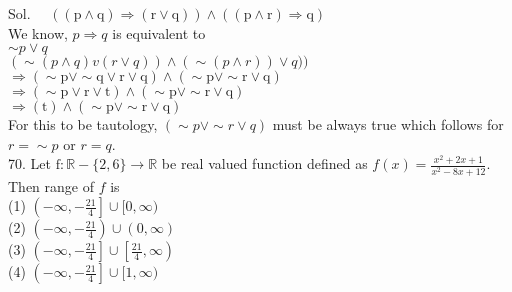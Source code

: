 \documentclass[10pt]{article}
\begin{document}
Sol. \(\quad((\mathrm{p} \wedge \mathrm{q}) \Rightarrow(\mathrm{r} \vee \mathrm{q})) \wedge((\mathrm{p} \wedge \mathrm{r}) \Rightarrow \mathrm{q})\)\\
We know, \(p \Rightarrow q\) is equivalent to\\
\(\sim p \vee q\)\\
\((\sim(p \wedge q) v(r \vee q)) \wedge(\sim(p \wedge r)) \vee q))\)\\
\(\Rightarrow(\sim \mathrm{p} \vee \sim \mathrm{q} \vee \mathrm{r} \vee \mathrm{q}) \wedge(\sim \mathrm{p} \vee \sim \mathrm{r} \vee \mathrm{q})\)\\
\(\Rightarrow(\sim \mathrm{p} \vee \mathrm{r} \vee \mathrm{t}) \wedge(\sim \mathrm{p} \vee \sim \mathrm{r} \vee \mathrm{q})\)\\
\(\Rightarrow(\mathrm{t}) \wedge(\sim \mathrm{p} \vee \sim \mathrm{r} \vee \mathrm{q})\)\\
For this to be tautology, \((\sim p \vee \sim r \vee q)\) must be always true which follows for \(r=\sim p\) or \(r=q\).\\
70. Let \(\mathrm{f}: \mathbb{R}-\{2,6\} \rightarrow \mathbb{R}\) be real valued function defined as \(f(x)=\frac{x^{2}+2 x+1}{x^{2}-8 x+12}\). Then range of \(f\) is\\
(1) \(\left(-\infty,-\frac{21}{4}\right] \cup[0, \infty)\)\\
(2) \(\left(-\infty,-\frac{21}{4}\right) \cup(0, \infty)\)\\
(3) \(\left(-\infty,-\frac{21}{4}\right] \cup\left[\frac{21}{4}, \infty\right)\)\\
(4) \(\left(-\infty,-\frac{21}{4}\right] \cup[1, \infty)\)
\end{document}
